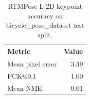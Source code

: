 \begin{table}[t]
\centering
\caption{RTMPose-L 2D keypoint accuracy on bicycle_pose_dataset test split.}
\begin{tabular}{lr}
\toprule
Metric & Value \\
\midrule
Mean pixel error & 3.39 \\
PCK@0.1 & 1.00 \\
Mean NME & 0.01 \\
\bottomrule
\end{tabular}
\end{table}